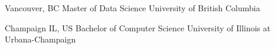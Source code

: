 \begin{experiences}

\degree
{Vancouver, BC}
{Master of Data Science}
{University of British Columbia}

\degree
{Champaign IL, US}
{Bachelor of Computer Science}
{University of Illinois at Urbana-Champaign}

\end{experiences}